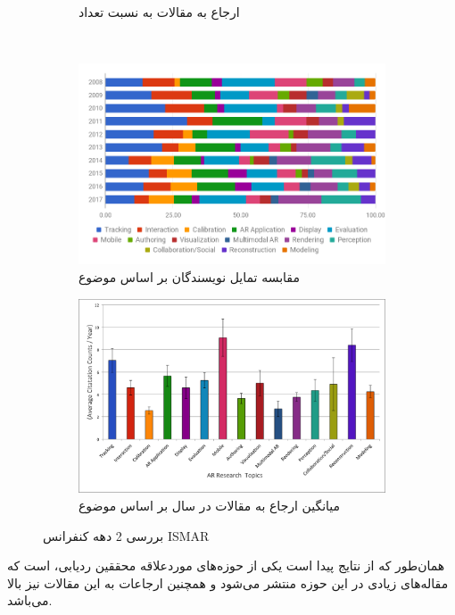 \begin{figure}
\begin{subfigure}[b]{0.4\textwidth}
		\caption{ارجاع به مقالات به نسبت تعداد}
		\label{fig:tiger}
	\end{subfigure}
	~ %
	\begin{subfigure}[b]{0.5\textwidth}
		\includegraphics[width=\textwidth]{image/ismar3}
		\caption{مقابسه تمایل نویسندگان بر اساس موضوع}
		\label{fig:tiger}
	\end{subfigure}
\begin{subfigure}[b]{0.5\textwidth}
	\includegraphics[width=\textwidth]{image/ismar4}
	\caption{میانگین ارجاع به مقالات در سال بر اساس موضوع}
	\label{fig:tiger}
\end{subfigure}
	\caption{بررسی 2 دهه کنفرانس ISMAR\cite{ismar}}\label{fig:ISMAR}
\end{figure}

 همان‌طور که از نتایج پیدا است یکی از حوزه‌های موردعلاقه محققین ردیابی، است که مقاله‌های زیادی در این حوزه منتشر می‌شود و همچنین ارجاعات به این مقالات نیز بالا می‌باشد.



